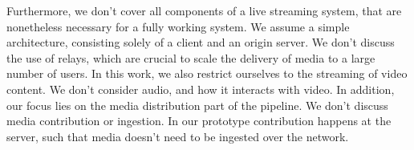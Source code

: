 Furthermore, we don't cover all components of a live streaming system, that are nonetheless necessary for a fully working system. We assume a simple architecture, consisting solely of a client and an origin server. We don't discuss the use of relays, which are crucial to scale the delivery of media to a large number of users. In this work, we also restrict ourselves to the streaming of video content. We don't consider audio, and how it interacts with video. In addition, our focus lies on the media distribution part of the pipeline. We don't discuss media contribution or ingestion. In our prototype contribution happens at the server, such that media doesn't need to be ingested over the network.